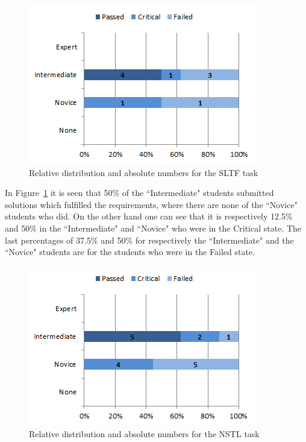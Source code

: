 \documentclass{sig-alternate-05-2015}
\begin{document}
\begin{figure}[!ht]
	\centering
	\includegraphics[width=1\linewidth]{img07}
	\caption{Relative distribution and absolute numbers for the SLTF task}
	\label{fig:SLTF percentage distributions with relative task numbers}
\end{figure}

In Figure~\ref{fig:SLTF percentage distributions with relative task numbers} it is seen that 50\% of the ``Intermediate" students submitted solutions which fulfilled the requirements, where there are none of the ``Novice" students who did. On the other hand one can see that it is respectively 12.5\% and 50\% in the ``Intermediate" and ``Novice" who were in the Critical state. The last percentages of 37.5\% and 50\% for respectively the ``Intermediate" and the ``Novice" students are for the students who were in the Failed state.

\begin{figure}[!ht]
	\centering
	\includegraphics[width=1\linewidth]{img08}
	\caption{Relative distribution and absolute numbers for the NSTL task}
	\label{fig:NSTL percentage distributions with relative task numbers}
\end{figure}
\end{document}
